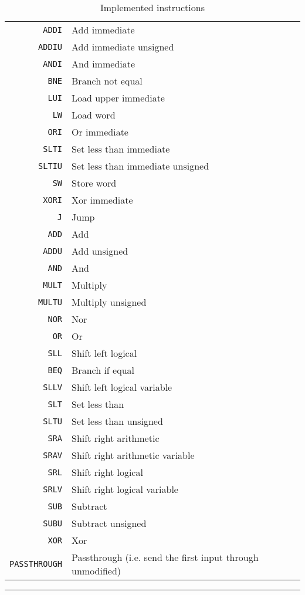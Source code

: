 \begin{table}
    \begin{center}
        \begin{tabular}{r|l}
            \texttt{ADDI} & Add immediate \\
            \texttt{ADDIU} & Add immediate unsigned \\
            \texttt{ANDI} & And immediate \\
            \texttt{BNE} & Branch not equal \\
            \texttt{LUI} & Load upper immediate \\
            \texttt{LW} & Load word \\
            \texttt{ORI} & Or immediate \\
            \texttt{SLTI} & Set less than immediate \\
            \texttt{SLTIU} & Set less than immediate unsigned \\
            \texttt{SW} & Store word \\
            \texttt{XORI} & Xor immediate \\
            \texttt{J} & Jump \\
            \texttt{ADD} & Add \\
            \texttt{ADDU} & Add unsigned \\
            \texttt{AND} & And \\
            \texttt{MULT} & Multiply \\
            \texttt{MULTU} & Multiply unsigned \\
            \texttt{NOR} & Nor \\
            \texttt{OR} & Or \\
            \texttt{SLL} & Shift left logical \\
            \texttt{BEQ} & Branch if equal \\
            \texttt{SLLV} & Shift left logical variable \\
            \texttt{SLT} & Set less than \\
            \texttt{SLTU} & Set less than unsigned \\
            \texttt{SRA} & Shift right arithmetic \\
            \texttt{SRAV} & Shift right arithmetic variable \\
            \texttt{SRL} & Shift right logical \\
            \texttt{SRLV} & Shift right logical variable \\
            \texttt{SUB} & Subtract \\
            \texttt{SUBU} & Subtract unsigned \\
            \texttt{XOR} & Xor \\
            \texttt{PASSTHROUGH} & Passthrough (i.e. send the first input through unmodified) \\
        \end{tabular}
        \smallskip
        \hrule
        \smallskip
        \caption{Implemented instructions}
        \label{table:implemented-instructions}
    \end{center}
\end{table}
